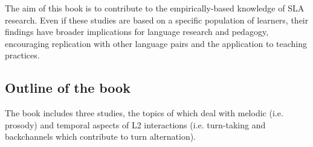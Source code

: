 \begin{styleStandard}
The aim of this book is to contribute to the empirically-based knowledge of SLA research. Even if these studies are based on a specific population of learners, their findings have broader implications for language research and pedagogy, encouraging replication with other language pairs and the application to teaching practices.
\end{styleStandard}

\subsection{Outline of the book}
\hypertarget{Toc191305877}{}\begin{styleStandard}
The book includes three studies, the topics of which deal with melodic (i.e. prosody) and temporal aspects of L2 interactions (i.e. turn-taking and backchannels which contribute to turn alternation). 
\end{styleStandard}

